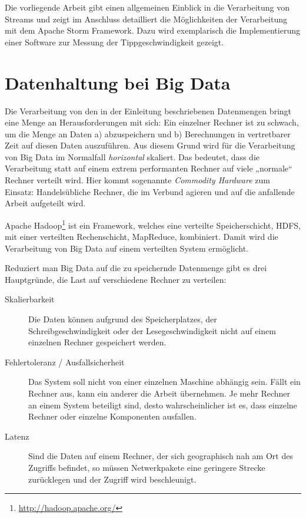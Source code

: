 \documentclass[a4paper,11pt]{scrartcl}
\begin{document}
  Die vorliegende Arbeit gibt einen allgemeinen Einblick in die Verarbeitung
  von Streams und zeigt im Anschluss detailliert die Möglichkeiten der
  Verarbeitung mit dem Apache Storm Framework. Dazu wird exemplarisch die
  Implementierung einer Software zur Messung der Tippgeschwindigkeit gezeigt.


  \section{Datenhaltung bei Big Data}
  Die Verarbeitung von den in der Einleitung beschriebenen Datenmengen bringt
  eine Menge an Herausforderungen mit sich: Ein einzelner Rechner ist zu
  schwach, um die Menge an Daten a) abzuspeichern und b) Berechnungen in
  vertretbarer Zeit auf diesen Daten auszuführen. Aus diesem Grund wird für die
  Verarbeitung von Big Data im Normalfall \textit{horizontal} skaliert. Das
  bedeutet, dass die Verarbeitung statt auf einem extrem performanten Rechner
  auf viele „normale“ Rechner verteilt wird.  Hier kommt sogenannte
  \textit{Commodity Hardware} zum Einsatz: Handelsübliche Rechner, die im
  Verbund agieren und auf die anfallende Arbeit aufgeteilt
  wird.\cite[S.~42]{white2010} 

  Apache Hadoop\footnote{\url{http://hadoop.apache.org/}} ist ein Framework,
  welches eine verteilte Speicherschicht, HDFS, mit einer verteilten
  Rechenschicht, MapReduce, kombiniert. Damit wird die Verarbeitung von Big
  Data auf einem verteilten System ermöglicht.

  Reduziert man Big Data auf die zu speichernde Datenmenge gibt es drei
  Hauptgründe, die Last auf verschiedene Rechner zu
  verteilen:\cite[S.~145]{kleppmann17}

  \begin{description}
    \item[Skalierbarkeit] Die Daten können aufgrund des Speicherplatzes, der
      Schreibgeschwindigkeit oder der Lesegeschwindigkeit nicht auf einem
      einzelnen Rechner gespeichert werden.
    \item[Fehlertoleranz / Ausfallsicherheit] Das System soll nicht von einer
      einzelnen Maschine abhängig sein. Fällt ein Rechner aus, kann ein anderer
      die Arbeit übernehmen. Je mehr Rechner an einem System beteiligt sind,
      desto wahrscheinlicher ist es, dass einzelne Rechner oder einzelne
      Komponenten ausfallen.
    \item[Latenz] Sind die Daten auf einem Rechner, der sich geographisch nah am
      Ort des Zugriffs befindet, so müssen Netwerkpakete eine geringere Strecke
      zurücklegen und der Zugriff wird beschleunigt.
  \end{description}
\end{document}
